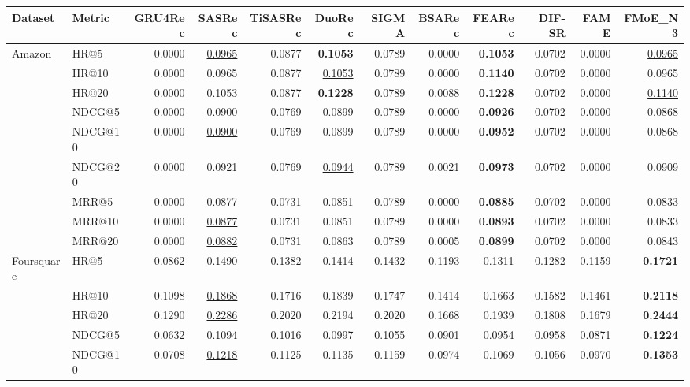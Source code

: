 \begin{tabular}{llrrrrrrrrrr}
\hline
Dataset & Metric & GRU4Rec & SASRec & TiSASRec & DuoRec & SIGMA & BSARec & FEARec & DIF-SR & FAME & FMoE\_N3 \\
\hline
Amazon & HR@5 & 0.0000 & \underline{0.0965} & 0.0877 & \textbf{0.1053} & 0.0789 & 0.0000 & \textbf{0.1053} & 0.0702 & 0.0000 & \underline{0.0965} \\
 & HR@10 & 0.0000 & 0.0965 & 0.0877 & \underline{0.1053} & 0.0789 & 0.0000 & \textbf{0.1140} & 0.0702 & 0.0000 & 0.0965 \\
 & HR@20 & 0.0000 & 0.1053 & 0.0877 & \textbf{0.1228} & 0.0789 & 0.0088 & \textbf{0.1228} & 0.0702 & 0.0000 & \underline{0.1140} \\
 & NDCG@5 & 0.0000 & \underline{0.0900} & 0.0769 & 0.0899 & 0.0789 & 0.0000 & \textbf{0.0926} & 0.0702 & 0.0000 & 0.0868 \\
 & NDCG@10 & 0.0000 & \underline{0.0900} & 0.0769 & 0.0899 & 0.0789 & 0.0000 & \textbf{0.0952} & 0.0702 & 0.0000 & 0.0868 \\
 & NDCG@20 & 0.0000 & 0.0921 & 0.0769 & \underline{0.0944} & 0.0789 & 0.0021 & \textbf{0.0973} & 0.0702 & 0.0000 & 0.0909 \\
 & MRR@5 & 0.0000 & \underline{0.0877} & 0.0731 & 0.0851 & 0.0789 & 0.0000 & \textbf{0.0885} & 0.0702 & 0.0000 & 0.0833 \\
 & MRR@10 & 0.0000 & \underline{0.0877} & 0.0731 & 0.0851 & 0.0789 & 0.0000 & \textbf{0.0893} & 0.0702 & 0.0000 & 0.0833 \\
 & MRR@20 & 0.0000 & \underline{0.0882} & 0.0731 & 0.0863 & 0.0789 & 0.0005 & \textbf{0.0899} & 0.0702 & 0.0000 & 0.0843 \\
\hline
Foursquare & HR@5 & 0.0862 & \underline{0.1490} & 0.1382 & 0.1414 & 0.1432 & 0.1193 & 0.1311 & 0.1282 & 0.1159 & \textbf{0.1721} \\
 & HR@10 & 0.1098 & \underline{0.1868} & 0.1716 & 0.1839 & 0.1747 & 0.1414 & 0.1663 & 0.1582 & 0.1461 & \textbf{0.2118} \\
 & HR@20 & 0.1290 & \underline{0.2286} & 0.2020 & 0.2194 & 0.2020 & 0.1668 & 0.1939 & 0.1808 & 0.1679 & \textbf{0.2444} \\
 & NDCG@5 & 0.0632 & \underline{0.1094} & 0.1016 & 0.0997 & 0.1055 & 0.0901 & 0.0954 & 0.0958 & 0.0871 & \textbf{0.1224} \\
 & NDCG@10 & 0.0708 & \underline{0.1218} & 0.1125 & 0.1135 & 0.1159 & 0.0974 & 0.1069 & 0.1056 & 0.0970 & \textbf{0.1353} \\

\end{tabular}
